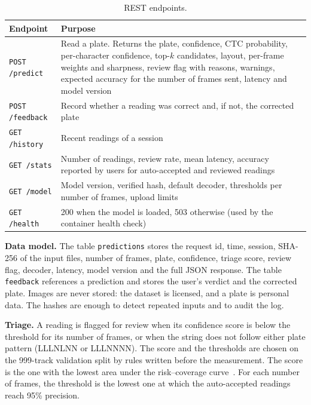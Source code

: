 \documentclass[11pt,a4paper]{article}
\begin{document}
\begin{table}[H]
\centering\small
\caption{REST endpoints.}\label{tab:endpoints}
\begin{tabularx}{\textwidth}{@{}P{3.2cm}L@{}}
\toprule
Endpoint & Purpose \\
\midrule
\texttt{POST /predict} & Read a plate. Returns the plate, confidence, CTC probability, per-character confidence, top-$k$ candidates, layout, per-frame weights and sharpness, review flag with reasons, warnings, expected accuracy for the number of frames sent, latency and model version \\
\texttt{POST /feedback} & Record whether a reading was correct and, if not, the corrected plate \\
\texttt{GET /history} & Recent readings of a session \\
\texttt{GET /stats} & Number of readings, review rate, mean latency, accuracy reported by users for auto-accepted and reviewed readings \\
\texttt{GET /model} & Model version, verified hash, default decoder, thresholds per number of frames, upload limits \\
\texttt{GET /health} & 200 when the model is loaded, 503 otherwise (used by the container health check) \\
\bottomrule
\end{tabularx}
\end{table}

\textbf{Data model.} The table \texttt{predictions} stores the request id, time, session, SHA-256 of the input files, number of frames, plate, confidence, triage score, review flag, decoder, latency, model version and the full JSON response. The table \texttt{feedback} references a prediction and stores the user's verdict and the corrected plate. Images are never stored: the dataset is licensed, and a plate is personal data. The hashes are enough to detect repeated inputs and to audit the log.

\textbf{Triage.} A reading is flagged for review when its confidence score is below the threshold for its number of frames, or when the string does not follow either plate pattern (LLLNLNN or LLLNNNN). The score and the thresholds are chosen on the 999-track validation split by rules written before the measurement. The score is the one with the lowest area under the risk--coverage curve~\cite{geifman2017selective}. For each number of frames, the threshold is the lowest one at which the auto-accepted readings reach 95\% precision.
\end{document}
